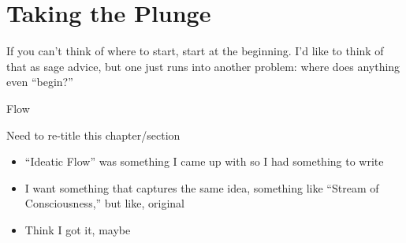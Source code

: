 \documentclass[./butidigress.tex]{subfiles}
\begin{document}
\chapter{Taking the Plunge}
\newpage

If you can't think of where to start, start at the beginning.
I'd like to think of that as sage advice, but one just runs into another problem: where does anything even \enquote{begin?}

\begin{somenotes}{Flow}
    \item Need to re-title this chapter/section\lips
    \begin{itemize}
        \item \enquote{Ideatic Flow} was something I came up with so I had something to write
        \item I want something that captures the same idea, something like \enquote{Stream of Consciousness,} but like, original
        \item Think I got it, maybe
    \end{itemize}
\end{somenotes}
\end{document}

